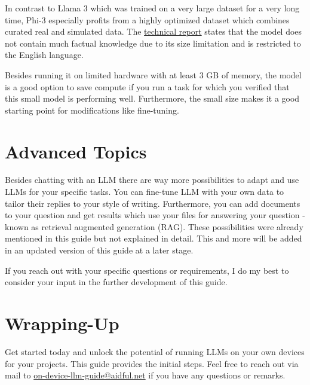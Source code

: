 \documentclass[parskip=half]{scrreprt} %
\begin{document}
In contrast to Llama 3 which was trained on a very large dataset for a very long time, Phi-3 especially profits from a highly optimized dataset which combines curated real and simulated data.
The \href{https://export.arxiv.org/abs/2404.14219}{technical report} states that the model does not contain much factual knowledge due to its size limitation and is restricted to the English language.

Besides running it on limited hardware with at least 3 GB of memory, the model is a good option to save compute if you run a task for which you verified that this small model is performing well.
Furthermore, the small size makes it a good starting point for modifications like fine-tuning.

\section{Advanced Topics}
Besides chatting with an LLM there are way more possibilities to adapt and use LLMs for your specific tasks.
You can fine-tune LLM with your own data to tailor their replies to your style of writing.
Furthermore, you can add documents to your question and get results which use your files for answering your question - known as retrieval augmented generation (RAG).
These possibilities were already mentioned in this guide but not explained in detail. This and more will be added in an updated version of this guide at a later stage.

If you reach out with your specific questions or requirements, I do my best to consider your input in the further development of this guide.

\section{Wrapping-Up}
Get started today and unlock the potential of running LLMs on your own devices for your projects.
This guide provides the initial steps.
Feel free to reach out via mail to \href{mailto:on-device-llm-guide@aidful.net}{on-device-llm-guide@aidful.net} if you have any questions or remarks.

\end{document}
